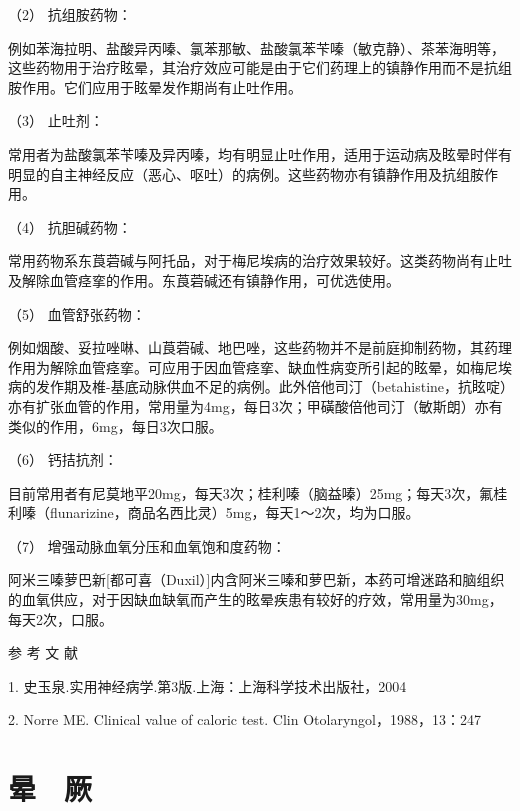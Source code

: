 \hypertarget{text00012.htmlux5cux23CHP1-3-3-3-3-2}{}
（2） 抗组胺药物：

例如苯海拉明、盐酸异丙嗪、氯苯那敏、盐酸氯苯苄嗪（敏克静）、茶苯海明等，这些药物用于治疗眩晕，其治疗效应可能是由于它们药理上的镇静作用而不是抗组胺作用。它们应用于眩晕发作期尚有止吐作用。

\hypertarget{text00012.htmlux5cux23CHP1-3-3-3-3-3}{}
（3） 止吐剂：

常用者为盐酸氯苯苄嗪及异丙嗪，均有明显止吐作用，适用于运动病及眩晕时伴有明显的自主神经反应（恶心、呕吐）的病例。这些药物亦有镇静作用及抗组胺作用。

\hypertarget{text00012.htmlux5cux23CHP1-3-3-3-3-4}{}
（4） 抗胆碱药物：

常用药物系东莨菪碱与阿托品，对于梅尼埃病的治疗效果较好。这类药物尚有止吐及解除血管痉挛的作用。东莨菪碱还有镇静作用，可优选使用。

\hypertarget{text00012.htmlux5cux23CHP1-3-3-3-3-5}{}
（5） 血管舒张药物：

例如烟酸、妥拉唑啉、山莨菪碱、地巴唑，这些药物并不是前庭抑制药物，其药理作用为解除血管痉挛。可应用于因血管痉挛、缺血性病变所引起的眩晕，如梅尼埃病的发作期及椎-基底动脉供血不足的病例。此外倍他司汀（betahistine，抗眩啶）亦有扩张血管的作用，常用量为4mg，每日3次；甲磺酸倍他司汀（敏斯朗）亦有类似的作用，6mg，每日3次口服。

\hypertarget{text00012.htmlux5cux23CHP1-3-3-3-3-6}{}
（6） 钙拮抗剂：

目前常用者有尼莫地平20mg，每天3次；桂利嗪（脑益嗪）25mg；每天3次，氟桂利嗪（flunarizine，商品名西比灵）5mg，每天1～2次，均为口服。

\hypertarget{text00012.htmlux5cux23CHP1-3-3-3-3-7}{}
（7） 增强动脉血氧分压和血氧饱和度药物：

阿米三嗪萝巴新{[}都可喜（Duxil）{]}内含阿米三嗪和萝巴新，本药可增迷路和脑组织的血氧供应，对于因缺血缺氧而产生的眩晕疾患有较好的疗效，常用量为30mg，每天2次，口服。


\hypertarget{text00013.htmlux5cux23CHP1-3-4}{}
参 考 文 献

1. 史玉泉.实用神经病学.第3版.上海：上海科学技术出版社，2004

2. Norre ME. Clinical value of caloric test. Clin
Otolaryngol，1988，13：247

\protect\hypertarget{text00014.html}{}{}

\chapter{晕　厥}

